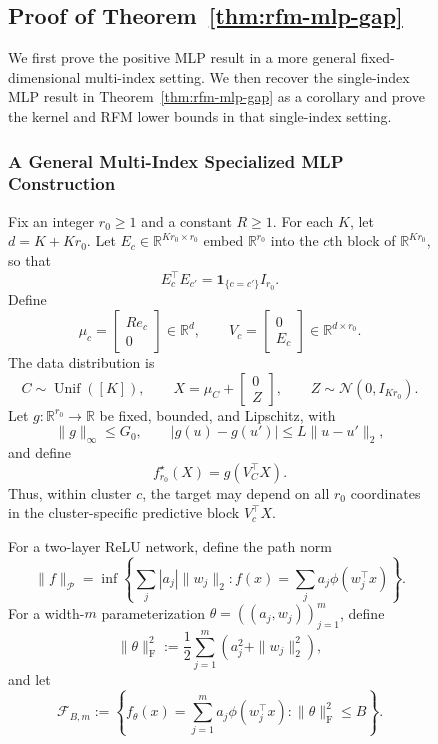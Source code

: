 \documentclass{article}
\newcounter{setting}[section]
\begin{document}
\begin{figure}
\subsection{Proof of Theorem~\ref{thm:rfm-mlp-gap}}
\label{app:proof-mlp-rfm-separation}


We first prove the positive MLP result in a more general fixed-dimensional
multi-index setting. We then recover the single-index MLP result in
Theorem~\ref{thm:rfm-mlp-gap} as a corollary and prove the kernel and RFM lower bounds in that
single-index setting.

\subsubsection{A General Multi-Index Specialized MLP Construction}

Fix an integer $r_0\geq1$ and a constant $R\geq1$. For each $K$, let
$d=K+Kr_0$. Let $E_c\in\mathbb R^{Kr_0\times r_0}$ embed
$\mathbb R^{r_0}$ into the $c$th block of $\mathbb R^{Kr_0}$, so that
\[
    E_c^\top E_{c'}=\mathbf 1_{\{c=c'\}}I_{r_0}.
\]
Define
\[
    \mu_c=
    \begin{bmatrix}
        Re_c\\
        0
    \end{bmatrix}
    \in\mathbb R^d,
    \qquad
    V_c=
    \begin{bmatrix}
        0\\
        E_c
    \end{bmatrix}
    \in\mathbb R^{d\times r_0}.
\]
The data distribution is
\[
    C\sim\operatorname{Unif}([K]),
    \qquad
    X=\mu_C+
    \begin{bmatrix}
        0\\
        Z
    \end{bmatrix},
    \qquad
    Z\sim\mathcal N(0,I_{Kr_0}).
\]
Let $g:\mathbb R^{r_0}\to\mathbb R$ be fixed, bounded, and Lipschitz, with
\[
    \|g\|_\infty\leq G_0,
    \qquad
    |g(u)-g(u')|\leq L\|u-u'\|_2,
\]
and define
\[
    f_{r_0}^\star(X)=g(V_C^\top X).
\]
Thus, within cluster $c$, the target may depend on all $r_0$ coordinates in
the cluster-specific predictive block $V_c^\top X$.

For a two-layer ReLU network, define the path norm
\[
    \|f\|_{\mathcal P}
    =\inf\left\{
        \sum_j|a_j|\|w_j\|_2:
        f(x)=\sum_j a_j\phi(w_j^\top x)
    \right\}.
\]
For a width-$m$ parameterization
$\theta=((a_j,w_j))_{j=1}^m$, define
\[
    \|\theta\|_{\mathrm F}^2
    :=\frac12\sum_{j=1}^m
        \left(a_j^2+\|w_j\|_2^2\right),
\]
and let
\[
    \mathcal F_{B,m}
    :=
    \left\{
        f_\theta(x)=\sum_{j=1}^m a_j\phi(w_j^\top x):
        \|\theta\|_{\mathrm F}^2\leq B
    \right\}.
\]


\end{figure}
\end{document}
